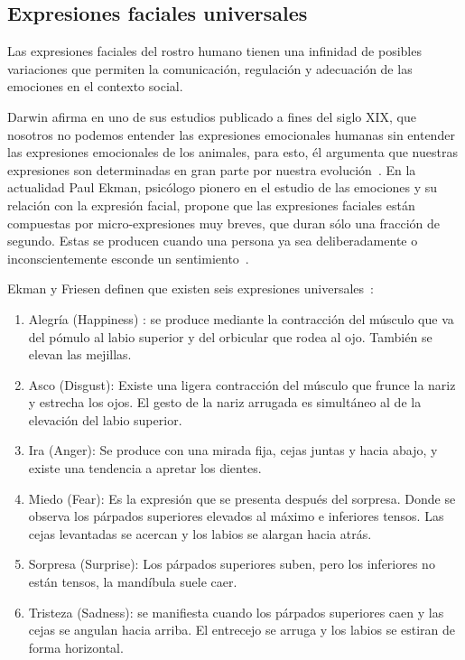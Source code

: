 \subsection{Expresiones faciales universales}
\label{sec:type_fe}

Las expresiones faciales del rostro humano tienen una infinidad de posibles variaciones que permiten la comunicación, regulación y adecuación de las emociones en el contexto social.

Darwin afirma en uno de  sus estudios publicado a fines del siglo XIX, que nosotros no podemos entender las expresiones emocionales humanas sin entender las expresiones emocionales de los animales, para esto, él argumenta que nuestras expresiones son determinadas en gran parte por nuestra evolución~\cite{Darwin1956,Darwin1998}. En la actualidad Paul Ekman, psicólogo pionero en el estudio de las emociones y su relación con la expresión facial, propone que las expresiones faciales están compuestas por micro-expresiones muy breves, que duran sólo una fracción de segundo. Estas se producen cuando una persona ya sea deliberadamente o inconscientemente esconde un sentimiento~\cite{Ekman1981}.

\newpage
Ekman y Friesen definen que existen seis expresiones universales~\cite{Ekman2003}: 

\begin{enumerate}
	\item Alegría (Happiness) : se produce mediante la contracción del músculo que va del pómulo al labio superior y del orbicular que rodea al ojo. También se elevan las mejillas. 
	\item Asco (Disgust): Existe una ligera contracción del músculo que frunce la nariz y estrecha los ojos. El gesto de la nariz arrugada es simultáneo al de la elevación del labio superior. 
	\item Ira (Anger): Se produce con una mirada fija, cejas juntas y hacia abajo, y existe una tendencia a apretar los dientes. 
	\item Miedo (Fear): Es la expresión que se presenta después del sorpresa. Donde se observa los párpados superiores elevados al máximo e inferiores tensos. Las cejas levantadas se acercan y los labios se alargan hacia atrás. 
	\item Sorpresa (Surprise): Los párpados superiores suben, pero los inferiores no están tensos, la mandíbula suele caer. 
	\item Tristeza (Sadness): se manifiesta cuando los párpados superiores caen y las cejas se angulan hacia arriba. El entrecejo se arruga y los labios se estiran de forma horizontal.
\end{enumerate}


